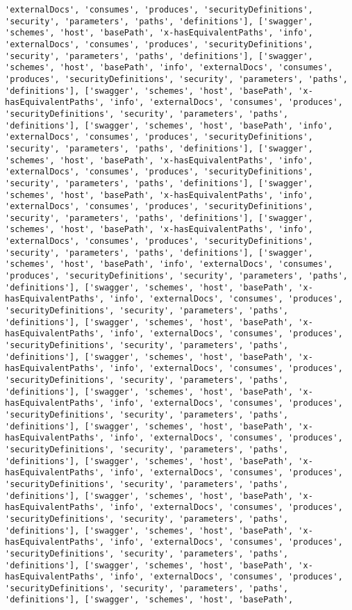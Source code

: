 \documentclass[11pt]{article}
\begin{document}
\begin{Verbatim}[commandchars=\\\{\}]
'externalDocs', 'consumes', 'produces', 'securityDefinitions', 'security', 'parameters', 'paths', 'definitions'], ['swagger', 'schemes', 'host', 'basePath', 'x-hasEquivalentPaths', 'info', 'externalDocs', 'consumes', 'produces', 'securityDefinitions', 'security', 'parameters', 'paths', 'definitions'], ['swagger', 'schemes', 'host', 'basePath', 'info', 'externalDocs', 'consumes', 'produces', 'securityDefinitions', 'security', 'parameters', 'paths', 'definitions'], ['swagger', 'schemes', 'host', 'basePath', 'x-hasEquivalentPaths', 'info', 'externalDocs', 'consumes', 'produces', 'securityDefinitions', 'security', 'parameters', 'paths', 'definitions'], ['swagger', 'schemes', 'host', 'basePath', 'info', 'externalDocs', 'consumes', 'produces', 'securityDefinitions', 'security', 'parameters', 'paths', 'definitions'], ['swagger', 'schemes', 'host', 'basePath', 'x-hasEquivalentPaths', 'info', 'externalDocs', 'consumes', 'produces', 'securityDefinitions', 'security', 'parameters', 'paths', 'definitions'], ['swagger', 'schemes', 'host', 'basePath', 'x-hasEquivalentPaths', 'info', 'externalDocs', 'consumes', 'produces', 'securityDefinitions', 'security', 'parameters', 'paths', 'definitions'], ['swagger', 'schemes', 'host', 'basePath', 'x-hasEquivalentPaths', 'info', 'externalDocs', 'consumes', 'produces', 'securityDefinitions', 'security', 'parameters', 'paths', 'definitions'], ['swagger', 'schemes', 'host', 'basePath', 'info', 'externalDocs', 'consumes', 'produces', 'securityDefinitions', 'security', 'parameters', 'paths', 'definitions'], ['swagger', 'schemes', 'host', 'basePath', 'x-hasEquivalentPaths', 'info', 'externalDocs', 'consumes', 'produces', 'securityDefinitions', 'security', 'parameters', 'paths', 'definitions'], ['swagger', 'schemes', 'host', 'basePath', 'x-hasEquivalentPaths', 'info', 'externalDocs', 'consumes', 'produces', 'securityDefinitions', 'security', 'parameters', 'paths', 'definitions'], ['swagger', 'schemes', 'host', 'basePath', 'x-hasEquivalentPaths', 'info', 'externalDocs', 'consumes', 'produces', 'securityDefinitions', 'security', 'parameters', 'paths', 'definitions'], ['swagger', 'schemes', 'host', 'basePath', 'x-hasEquivalentPaths', 'info', 'externalDocs', 'consumes', 'produces', 'securityDefinitions', 'security', 'parameters', 'paths', 'definitions'], ['swagger', 'schemes', 'host', 'basePath', 'x-hasEquivalentPaths', 'info', 'externalDocs', 'consumes', 'produces', 'securityDefinitions', 'security', 'parameters', 'paths', 'definitions'], ['swagger', 'schemes', 'host', 'basePath', 'x-hasEquivalentPaths', 'info', 'externalDocs', 'consumes', 'produces', 'securityDefinitions', 'security', 'parameters', 'paths', 'definitions'], ['swagger', 'schemes', 'host', 'basePath', 'x-hasEquivalentPaths', 'info', 'externalDocs', 'consumes', 'produces', 'securityDefinitions', 'security', 'parameters', 'paths', 'definitions'], ['swagger', 'schemes', 'host', 'basePath', 'x-hasEquivalentPaths', 'info', 'externalDocs', 'consumes', 'produces', 'securityDefinitions', 'security', 'parameters', 'paths', 'definitions'], ['swagger', 'schemes', 'host', 'basePath', 'x-hasEquivalentPaths', 'info', 'externalDocs', 'consumes', 'produces', 'securityDefinitions', 'security', 'parameters', 'paths', 'definitions'], ['swagger', 'schemes', 'host', 'basePath', 
\end{Verbatim}
\end{document}
